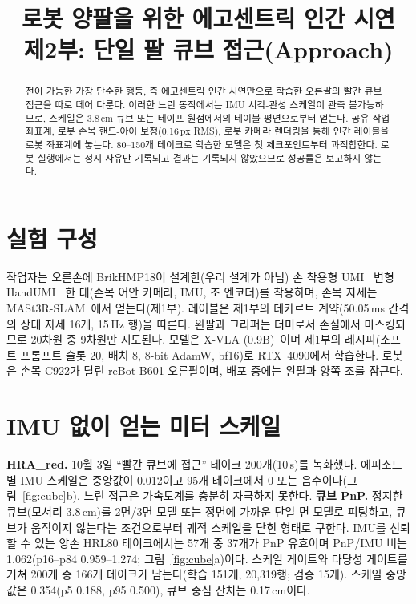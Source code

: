 \documentclass[conference,10pt]{IEEEtran}
\begin{document}
\title{로봇 양팔을 위한 에고센트릭 인간 시연\\제2부: 단일 팔 큐브 접근(Approach)}
\author{
}
\maketitle

\begin{abstract}
전이 가능한 가장 단순한 행동, 즉 에고센트릭 인간 시연만으로 학습한 오른팔의 빨간 큐브 접근을 따로 떼어 다룬다. 이러한
느린 동작에서는 IMU 시각-관성 스케일이 관측 불가능하므로, 스케일은 3.8\,cm 큐브 또는 테이프 원점에서의 테이블 평면으로부터
얻는다. 공유 작업 좌표계, 로봇 손목 핸드-아이 보정(0.16\,px RMS), 로봇 카메라 렌더링을 통해 인간 레이블을 로봇 좌표계에
놓는다. 80--150개 테이크로 학습한 모델은 첫 체크포인트부터 과적합한다. 로봇 실행에서는 정지 사유만 기록되고 결과는
기록되지 않았으므로 성공률은 보고하지 않는다.
\end{abstract}

\section{실험 구성}
작업자는 오른손에 BrikHMP18이 설계한(우리 설계가 아님) 손 착용형 UMI~\cite{chi2024umi} 변형 HandUMI~\cite{handumi_hw} 한 대(손목 어안 카메라, IMU, 조 엔코더)를 착용하며, 손목 자세는
MASt3R-SLAM~\cite{murai2025mast3rslam}에서 얻는다(제1부). 레이블은 제1부의 데카르트 계약(50.05\,ms 간격의 상대 자세 16개,
15\,Hz 행)을 따른다. 왼팔과 그리퍼는 더미로서 손실에서 마스킹되므로 20차원 중 9차원만 지도된다. 모델은 X-VLA
(0.9B)~\cite{zheng2025xvla}이며 제1부의 레시피(소프트 프롬프트 슬롯 20, 배치 8, 8-bit AdamW, bf16)로 RTX~4090에서 학습한다.
로봇은 손목 C922가 달린 reBot B601 오른팔이며, 배포 중에는 왼팔과 양쪽 조를 잠근다.

\section{IMU 없이 얻는 미터 스케일}
\textbf{HRA\_red.} 10월 3일 ``빨간 큐브에 접근'' 테이크 200개(10\,s)를 녹화했다. 에피소드별 IMU 스케일은 중앙값이
0.012이고 95개 테이크에서 0 또는 음수이다(그림~\ref{fig:cube}b). 느린 접근은 가속도계를 충분히 자극하지 못한다.
\textbf{큐브 PnP.} 정지한 큐브(모서리 3.8\,cm)를 2면/3면 모델 또는 정면에 가까운 단일 면 모델로 피팅하고, 큐브가 움직이지
않는다는 조건으로부터 궤적 스케일을 닫힌 형태로 구한다. IMU를 신뢰할 수 있는 양손 HRL80 테이크에서는 57개 중 37개가 PnP
유효이며 PnP/IMU 비는 1.062(p16--p84 0.959--1.274; 그림~\ref{fig:cube}a)이다. 스케일 게이트와 타당성 게이트를 거쳐 200개 중
166개 테이크가 남는다(학습 151개, 20{,}319행; 검증 15개). 스케일 중앙값은 0.354(p5 0.188, p95 0.500), 큐브 중심 잔차는
0.17\,cm이다.
\end{document}
